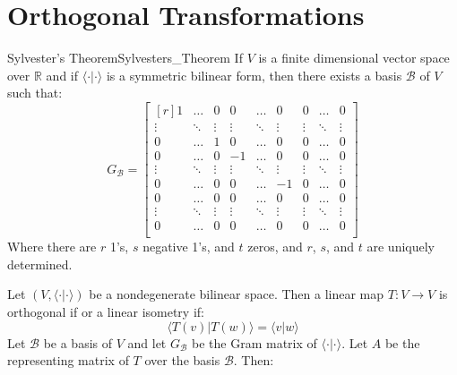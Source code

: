 \documentclass{article}                                                        %
\begin{document}
    \section{Orthogonal Transformations}
        \begin{ltheorem}{Sylvester's Theorem}{Sylvesters_Theorem}
            If $V$ is a finite dimensional vector space over $\mathbb{R}$ and if
            $\langle\cdot|\cdot\rangle$ is a symmetric bilinear form, then there
            exists a basis $\mathscr{B}$ of $V$ such that:
            \begin{equation}
                G_{\mathscr{B}}=
                \begin{bmatrix*}[r]
                    1&\dots&0&0&\dots&0&0&\dots&0\\
                    \vdots&\ddots&\vdots&\vdots&\ddots
                        &\vdots&\vdots&\ddots&\vdots\\
                    0&\dots&1&0&\dots&0&0&\dots&0\\
                    0&\dots&0&\minus{1}&\dots&0&0&\dots&0\\
                    \vdots&\ddots&\vdots&\vdots
                        &\ddots&\vdots&\vdots&\ddots&\vdots\\
                    0&\dots&0&0&\dots&\minus{1}&0&\dots&0\\
                    0&\dots&0&0&\dots&0&0&\dots&0\\
                    \vdots&\ddots&\vdots&\vdots&\ddots
                        &\vdots&\vdots&\ddots&\vdots\\
                    0&\dots&0&0&\dots&0&0&\dots&0\\
                \end{bmatrix*}
            \end{equation}
            Where there are $r$ 1's, $s$ negative 1's, and $t$ zeros, and
            $r$, $s$, and $t$ are uniquely determined.
        \end{ltheorem}
        Let $(V,\langle\cdot|\cdot\rangle)$ be a nondegenerate bilinear space.
        Then a linear map $T:V\rightarrow{V}$ is orthogonal if or a linear
        isometry if:
        \begin{equation}
            \langle{T}(v)|T(w)\rangle=\langle{v}|w\rangle
        \end{equation}
        Let $\mathscr{B}$ be a basis of $V$ and let $G_{\mathscr{B}}$ be the
        Gram matrix of $\langle\cdot|\cdot\rangle$. Let $A$ be the representing
        matrix of $T$ over the basis $\mathscr{B}$. Then:
\end{document}

